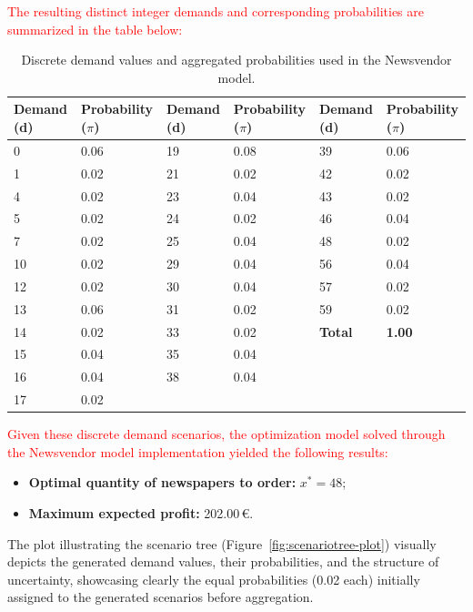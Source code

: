 \documentclass[a4paper,12pt]{article}
\begin{document}
	\noindent 

\textcolor{red}{The resulting distinct integer demands and corresponding probabilities are summarized in the table below:}	
	
	\begin{table}[htbp]
		\centering
		\footnotesize %
		\label{tab:newsvendor-general}
		\renewcommand{\arraystretch}{1.1}
		\begin{tabular}{|@{\hskip 2pt}p{1.5cm}@{\hskip 2pt}|@{\hskip 2pt}p{2.0cm}@{\hskip 2pt}||@{\hskip 2pt}p{1.5cm}@{\hskip 2pt}|@{\hskip 2pt}p{2.0cm}@{\hskip 2pt}||@{\hskip 2pt}p{1.5cm}@{\hskip 2pt}|@{\hskip 2pt}p{2.0cm}@{\hskip 2pt}|}
			\hline
			\textbf{Demand (d)} & \textbf{Probability ($\pi$)} & \textbf{Demand (d)} & \textbf{Probability ($\pi$)} & \textbf{Demand (d)} & \textbf{Probability ($\pi$)} \\
			\hline
			0 & 0.06 & 19 & 0.08 & 39 & 0.06 \\
			1 & 0.02 & 21 & 0.02 & 42 & 0.02 \\
			4 & 0.02 & 23 & 0.04 & 43 & 0.02 \\
			5 & 0.02 & 24 & 0.02 & 46 & 0.04 \\
			7 & 0.02 & 25 & 0.04 & 48 & 0.02 \\
			10 & 0.02 & 29 & 0.04 & 56 & 0.04 \\
			12 & 0.02 & 30 & 0.04 & 57 & 0.02 \\
			13 & 0.06 & 31 & 0.02 & 59 & 0.02 \\
			14 & 0.02 & 33 & 0.02 & \textbf{Total} & \textbf{1.00} \\
			15 & 0.04 & 35 & 0.04 & & \\
			16 & 0.04 & 38 & 0.04 & & \\
			17 & 0.02 & & & & \\
			\hline
		\end{tabular}
		\caption{Discrete demand values and aggregated probabilities used in the Newsvendor model.}
	\end{table}
	
	
\textcolor{red}{Given these discrete demand scenarios, the optimization model solved through the Newsvendor model implementation yielded the following results:}	
	
	\begin{itemize}
		\item \textbf{Optimal quantity of newspapers to order:} $x^* = 48$;
		\item \textbf{Maximum expected profit:} 202.00\,€.
	\end{itemize}
	\newpage
	The plot illustrating the scenario tree (Figure~\ref{fig:scenariotree-plot}) visually depicts the generated demand values, their probabilities, and the structure of uncertainty, showcasing clearly the equal probabilities (0.02 each) initially assigned to the generated scenarios before aggregation.
	
\end{document}
